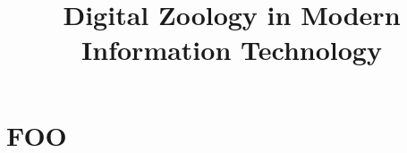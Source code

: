 \documentclass[utf8]{jydiss}
\title{Digital Zoology in Modern Information Technology}
\begin{document}
\mainmatter
\appendices
\chapter{FOO} %
\end{document}
